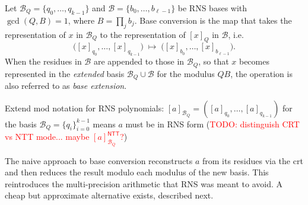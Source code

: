 \iftrue{ %
    \begin{definition}
        Let $\mathcal{B}_Q = \{q_0,\dots,q_{k-1}\}$ and
        $\mathcal{B} = \{b_0,\dots,b_{\ell-1}\}$ be RNS bases with
        $\gcd(Q, B) = 1$, where $B = \prod_{j} b_j$. Base conversion is
        the map that takes the representation of $x$ in $\mathcal{B}_Q$
        to the representation of $[x]_Q$ in $\mathcal{B}$, i.e.
        \[
            \big([x]_{q_0}, \dots, [x]_{q_{k-1}}\big)
            \;\longmapsto\;
            \big([x]_{b_0}, \dots, [x]_{b_{\ell-1}}\big).
        \]
        When the residues in $\mathcal{B}$ are appended to those in $\mathcal{B}_Q$, so that $x$ becomes represented in the \textit{extended} basis $\mathcal{B}_Q \cup \mathcal{B}$ for the modulus $QB$, the operation is also referred to as \emph{base extension}.
    \end{definition}
}\fi


\begin{remark}
    Extend mod notation for RNS polynomials: $[a]_{\mathcal{B}_Q} = ([a]_{q_0}, \dots, [a]_{q_{k-1}})$ for the basis $\mathcal{B}_Q = \{q_i\}_{i=0}^{k-1}$ means $a$ must be in RNS form (\textcolor{red}{TODO: distinguish CRT vs NTT mode... maybe $[a]^\mathsf{NTT}_{\mathcal{B}_Q}$?})
\end{remark}

The naive approach to base conversion reconstructs $a$ from its residues via the \gls{crt} and then reduces the result modulo each modulus of the new basis. This reintroduces the multi-precision arithmetic that RNS was meant to avoid. A cheap but approximate alternative exists, described next.


